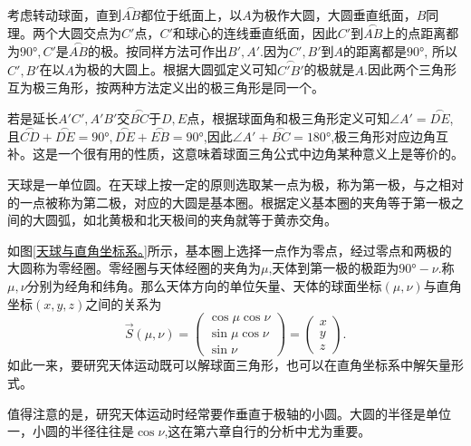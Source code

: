 \documentclass[11pt, a4paper, oneside]{ctexart}
\numberwithin{equation}{subsection}
\begin{document}
考虑转动球面，直到$\overset{\frown}{AB}$都位于纸面上，以$A$为极作大圆，大圆垂直纸面，$B$同理。两个大圆交点为$C'$点，$C'$和球心的连线垂直纸面，因此$C'$到$\overset{\frown}{AB}$上的点距离都为$\ang{90;;},C'$是$\overset{\frown}{AB}$的极。按同样方法可作出$B',A'$.因为$C',B'$到$A$的距离都是$\ang{90;;}$, 所以$C',B'$在以$A$为极的大圆上。根据大圆弧定义可知$\overset{\frown}{C'B'}$的极就是$A$.因此两个三角形互为极三角形，按两种方法定义出的极三角形是同一个。

若是延长$A'C',A'B'$交$\overset{\frown}{BC}$于$D,E$点，根据球面角和极三角形定义可知$\angle A'=\overset{\frown}{DE}$,且$\overset{\frown}{CD}+\overset{\frown}{DE}=\ang{90;;},\overset{\frown}{DE}+\overset{\frown}{EB}=\ang{90;;}$,因此$\angle A'+\overset{\frown}{BC}=\ang{180;;}$,极三角形对应边角互补。这是一个很有用的性质，这意味着球面三角公式中边角某种意义上是等价的。

天球是一单位圆。在天球上按一定的原则选取某一点为极，称为第一极，与之相对的一点被称为第二极，对应的大圆是基本圈。根据定义基本圈的夹角等于第一极之间的大圆弧，如北黄极和北天极间的夹角就等于黄赤交角。

如图\ref{天球与直角坐标系。}所示，基本圈上选择一点作为零点，经过零点和两极的大圆称为零经圈。零经圈与天体经圈的夹角为$\mu$,天体到第一极的极距为$\ang{90;;}-\nu$.称$\mu,\nu$分别为经角和纬角。那么天体方向的单位矢量、天体的球面坐标$\left(\mu,\nu\right)$与直角坐标$\left(x,y,z\right)$之间的关系为
\begin{equation}
\vec{S}\left(\mu,\nu\right)=
\begin{pmatrix}
\cos\mu\cos\nu\\
\sin\mu\cos\nu\\
\sin\nu
\end{pmatrix}=
\begin{pmatrix}
x\\y\\z
\end{pmatrix}.
\end{equation}
如此一来，要研究天体运动既可以解球面三角形，也可以在直角坐标系中解矢量形式。

值得注意的是，研究天体运动时经常要作垂直于极轴的小圆。大圆的半径是单位一，小圆的半径往往是$\cos\nu$,这在第六章自行的分析中尤为重要。
\end{document}
